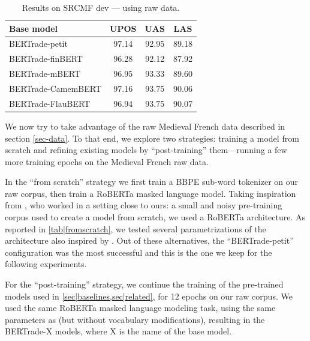 \begin{table}[tbh]
    \centering
    \tablefontsize
    \begin{tabular}{l*{3}{S[table-format=2.2]}}
        \toprule
        {\textbf{Base model}} & {\textbf{UPOS}} & {\textbf{UAS}} & {\textbf{LAS}} \\
        \midrule
        BERTrade-petit        & 97.14           & 92.95          & 89.18          \\
        \midrule
        BERTrade-finBERT      & 96.28           & 92.12          & 87.92          \\
        BERTrade-mBERT        & 96.95           & 93.33          & 89.60          \\
        BERTrade-CamemBERT    & 97.16           & 93.75          & 90.06          \\
        BERTrade-FlauBERT     & 96.94           & 93.75          & 90.07          \\
        \bottomrule
    \end{tabular}
    \caption{Results on SRCMF dev — using raw data.}\label{tab|post-train}
\end{table}

We now try to take advantage of the raw Medieval French data described in section \ref{sec-data}.
To that end, we explore two strategies: training a model from scratch and refining existing models by \enquote{post-training} them---running a few more training epochs on the Medieval French raw data.

In the \enquote{from scratch} strategy we first train a BBPE sub-word tokenizer \citep{wang-cho-etal-2020-neural}
on our raw corpus, then train a RoBERTa \citep{liu-etal-2019-roberta} masked language model.
Taking inspiration from \citet{micheli-etal-2020-importance}, who worked in a setting close to ours: a small and noisy pre-training corpus used to create a model from scratch, we used a RoBERTa architecture.
As reported in \cref{tab|fromscratch}, we tested several parametrizations of the architecture
also inspired by \citet{turc-etal-2019-well}.
Out of these alternatives, the \enquote{BERTrade-petit} configuration was the
most successful and this is the one we keep for the following experiments.

For the \enquote{post-training} strategy, we continue the training of the pre-trained models used in \cref{sec|baselines,sec|related}, for \num{12} epochs on our raw corpus. We used the same RoBERTa masked language modeling task, using the same parameters as \citet{wang-etal-2020-extending} (but without vocabulary modifications), resulting in the BERTrade-X models, where X is the name of the base model.

